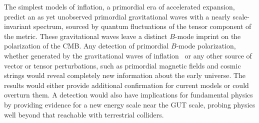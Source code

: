 The simplest models of inflation, a primordial era of accelerated expansion, predict an as yet 
unobserved primordial gravitational waves with a nearly scale-invariant spectrum, sourced by 
quantum fluctuations of the tensor component of the metric. 
These gravitational waves leave a distinct $B$-mode imprint on the polarization of the \ac{CMB}. Any 
detection of primordial $B$-mode polarization, whether generated by the gravitational waves 
of inflation~\cite{kamionkowski97a,zaldarriaga97} or any other source of vector or tensor perturbations, 
such as primordial magnetic fields \cite{Seshadri:2000ky,Lewis:2004ef,Ade:2015cao,Zucca:2016iur} and 
cosmic strings \cite{Turok:1997gj,Seljak:2006hi,Avgoustidis:2011ax,Moss:2014cra} would reveal completely 
new information about the early universe. The results would either provide additional confirmation for 
current models or could overturn them. A detection would also have implications for fundamental physics 
by providing evidence for a new energy scale near the GUT scale, probing physics well beyond that reachable
with terrestrial colliders. 
